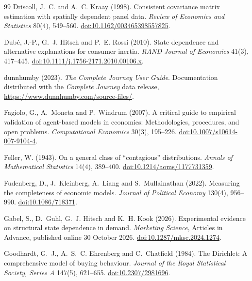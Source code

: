 \documentclass[11pt]{article}
\begin{document}
\begin{thebibliography}{99}
Driscoll, J.~C. and A.~C. Kraay (1998).
Consistent covariance matrix estimation with spatially dependent panel data.
\emph{Review of Economics and Statistics} 80(4), 549--560.
\href{https://doi.org/10.1162/003465398557825}{doi:10.1162/003465398557825}.

Dub{\'e}, J.-P., G.~J. Hitsch and P.~E. Rossi (2010).
State dependence and alternative explanations for consumer inertia.
\emph{RAND Journal of Economics} 41(3), 417--445.
\href{https://doi.org/10.1111/j.1756-2171.2010.00106.x}{doi:10.1111/j.1756-2171.2010.00106.x}.

dunnhumby (2023).
\emph{The Complete Journey User Guide}. Documentation distributed with the \emph{Complete
Journey} data release, \url{https://www.dunnhumby.com/source-files/}.

Fagiolo, G., A.~Moneta and P.~Windrum (2007).
A critical guide to empirical validation of agent-based models in economics: Methodologies,
procedures, and open problems.
\emph{Computational Economics} 30(3), 195--226.
\href{https://doi.org/10.1007/s10614-007-9104-4}{doi:10.1007/s10614-007-9104-4}.

Feller, W. (1943).
On a general class of ``contagious'' distributions.
\emph{Annals of Mathematical Statistics} 14(4), 389--400.
\href{https://doi.org/10.1214/aoms/1177731359}{doi:10.1214/aoms/1177731359}.

Fudenberg, D., J.~Kleinberg, A.~Liang and S.~Mullainathan (2022).
Measuring the completeness of economic models.
\emph{Journal of Political Economy} 130(4), 956--990.
\href{https://doi.org/10.1086/718371}{doi:10.1086/718371}.

Gabel, S., D.~Guhl, G.~J. Hitsch and K.~H. Kook (2026).
Experimental evidence on structural state dependence in demand.
\emph{Marketing Science}, Articles in Advance, published online 30 October 2026.
\href{https://doi.org/10.1287/mksc.2024.1274}{doi:10.1287/mksc.2024.1274}.

Goodhardt, G.~J., A.~S.~C. Ehrenberg and C.~Chatfield (1984).
The {D}irichlet: A comprehensive model of buying behaviour.
\emph{Journal of the Royal Statistical Society, Series A} 147(5), 621--655.
\href{https://doi.org/10.2307/2981696}{doi:10.2307/2981696}.


\end{thebibliography}
\end{document}
